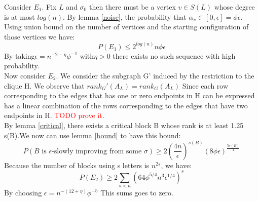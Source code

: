\documentclass[12pt]{article}
\begin{document}
Consider $E_1$. Fix $L$ and $\sigma_0$ then there must be a vertex $v \in S(L)$ whose degree is at most $log(n)$. By lemma  \ref{noise}, the probability that $\alpha_v \in [0, \epsilon] = \phi \epsilon$. Using union bound on the number of vertices and the starting configuration of those vertices we have:
\begin{equation}
P(E_1)  \leq 2^{log(n)}n \phi \epsilon
\end{equation}
By taking$\epsilon = n^{-2 - \eta} \phi^{-1}$ with$\eta > 0$ there exists no such sequence with high probability. \\

Now consider $E_2$. We consider the subgraph G' induced by the restriction to the clique H. We observe that $rank_G'(A_L) = rank_G(A_L)$ Since each row corresponding to the edges that has one or zero endpoints in H can be expressed has a linear combination of the rows corresponding to the edges that have two endpoints in H. \textcolor{red}{TODO prove it}. \\
By lemma \ref{critical}, there exists a critical block B whose rank is at least 1.25 s(B).We now can use lemma \ref{bound} to have this bound:
\begin{equation*}
P(B \text{ is }\epsilon \text {-slowly improving from some }\sigma) \geq 2(\frac{4n}{\epsilon})^{s(B)}(8\phi\epsilon)^{\frac{5s(B)}{4}}
\end{equation*}
Because the number of blocks using s letters is $n^{2s}$, we have:
\begin{equation*}
P(E_2) \geq 2 \sum_{s < n}(64\phi^{5/4}n^3\epsilon^{1/4})^s
\end{equation*}
By choosing $\epsilon = n^{-(12 + \eta)}\phi^{-5}$ This sums goes to zero.
\end{document}
